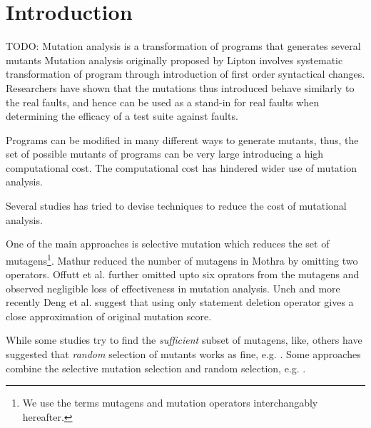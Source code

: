\section{Introduction}


TODO: Mutation analysis is a transformation of programs that generates several mutants 
Mutation analysis originally proposed by Lipton\cite{lipton1971fault} involves systematic transformation of program through introduction of first order syntactical changes\cite{ammann2008introduction}. Researchers have shown that the mutations thus introduced behave similarly to the real faults\cite{andrews2005mutation}, and hence can be used as a stand-in for real faults when determining the efficacy of a test suite against faults. 

Programs can be modified in many different ways to generate mutants, thus, the set of 
possible mutants of programs can be very large introducing a high computational cost.
The computational cost has hindered wider use of mutation analysis.

Several studies has tried to devise techniques to reduce the cost of mutational analysis.
\begin{comment}
  Offut \cite{offutt2001mutation} classifies these techniques into the following three categories:
  \begin{enumerata}
  \item \emph{Do fewer}: techniques that try to reduce the number of mutants.
  \item \emph{Do faser}: techniques that 
  \item \emph{Do smarter}: techniques that 
  \end{enumerate}
\end{comment}
One of the main approaches is selective mutation which reduces the set of mutagens\footnote{We use the terms mutagens 
and mutation operators interchangably hereafter.}.
Mathur \cite{} reduced the number of mutagens in Mothra \cite{Mothra} by omitting two operators. 
Offutt et al.\cite{offutt1993anexperimental} further omitted upto six oprators from the 
mutagens and observed negligible loss of effectiveness in mutation analysis. 
Unch\cite{untch2009onreduced} and more recently Deng et al.\cite{deng2013empirical} suggest
that using only statement deletion operator gives a close approximation of original mutation score.

While some studies try to 
find the \emph{sufficient} subset of mutagens, like\cite{siami2008sufficient}, others 
have suggested that \emph{random} selection of mutants works as fine, e.g. \cite{zhang2010operator}.
Some approaches combine the selective mutation selection and random selection, e.g. \cite{zhang2013ase}.

